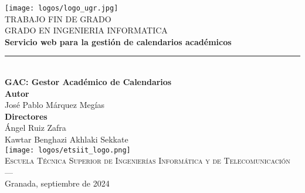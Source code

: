 \begin{titlepage}
\newlength{\centeroffset}
\setlength{\centeroffset}{-0.5\oddsidemargin}
\addtolength{\centeroffset}{0.5\evensidemargin}
\thispagestyle{empty}

\noindent\hspace*{\centeroffset}\begin{minipage}{\textwidth}

\centering
\texttt{[image: logos/logo\_ugr.jpg]}\\[1.4cm]

\textsc{ \Large TRABAJO FIN DE GRADO\\[0.2cm]}
\textsc{ GRADO EN INGENIERIA INFORMATICA}\\[1cm]

{\Huge\bfseries Servicio web para la gestión de calendarios académicos \\}
\noindent\rule[-1ex]{\textwidth}{3pt}\\[3.5ex]
{\large\bfseries GAC: Gestor Académico de Calendarios}\\
\vspace{1cm}
\textbf{Autor}\\ {José Pablo Márquez Megías}\\[2.5ex]
\textbf{Directores}\\ {Ángel Ruiz Zafra\\Kawtar Benghazi Akhlaki Sekkate}\\[2cm]
\texttt{[image: logos/etsiit\_logo.png]}\\[0.1cm]
\textsc{Escuela Técnica Superior de Ingenierías Informática y de Telecomunicación}\\
\textsc{---}\\
Granada, septiembre de 2024
\end{minipage}
\end{titlepage}

